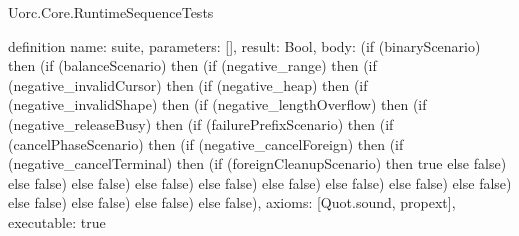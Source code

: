 \begin{lexlean}{Uorc.Core.RuntimeSequenceTests}
\begin{semanticmodule}
definition{
  name: suite,
  parameters: [],
  result: Bool,
  body: (if (binaryScenario) then (if (balanceScenario) then (if (negative_range) then (if (negative_invalidCursor) then (if (negative_heap) then (if (negative_invalidShape) then (if (negative_lengthOverflow) then (if (negative_releaseBusy) then (if (failurePrefixScenario) then (if (cancelPhaseScenario) then (if (negative_cancelForeign) then (if (negative_cancelTerminal) then (if (foreignCleanupScenario) then true else false) else false) else false) else false) else false) else false) else false) else false) else false) else false) else false) else false) else false),
  axioms: [Quot.sound, propext],
  executable: true
}
\end{semanticmodule}
\end{lexlean}
